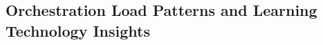 \documentclass[10pt,journal,compsoc]{IEEEtran}
\begin{document}

\subsection{Orchestration Load Patterns and Learning Technology Insights}
\end{document}
